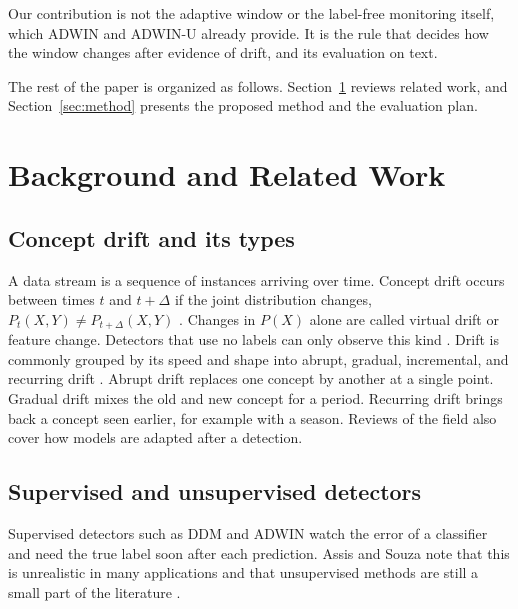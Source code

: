 \documentclass[conference]{IEEEtran}
\begin{document}
Our contribution is not the adaptive window or the label-free monitoring itself, which ADWIN and ADWIN-U already provide. It is the rule that decides how the window changes after evidence of drift, and its evaluation on text.

The rest of the paper is organized as follows. Section~\ref{sec:related} reviews related work, and Section~\ref{sec:method} presents the proposed method and the evaluation plan.

\section{Background and Related Work}
\label{sec:related}

\subsection{Concept drift and its types}

A data stream is a sequence of instances arriving over time. Concept drift occurs between times $t$ and $t+\Delta$ if the joint distribution changes, $P_t(X,Y)\neq P_{t+\Delta}(X,Y)$ \cite{gama2014}. Changes in $P(X)$ alone are called virtual drift or feature change. Detectors that use no labels can only observe this kind \cite{assis2025}. Drift is commonly grouped by its speed and shape into abrupt, gradual, incremental, and recurring drift \cite{webb2016,suarez2023}. Abrupt drift replaces one concept by another at a single point. Gradual drift mixes the old and new concept for a period. Recurring drift brings back a concept seen earlier, for example with a season. Reviews of the field \cite{gama2014,lu2019} also cover how models are adapted after a detection.

\subsection{Supervised and unsupervised detectors}

Supervised detectors such as DDM \cite{gama2004} and ADWIN \cite{bifet2007} watch the error of a classifier and need the true label soon after each prediction. Assis and Souza note that this is unrealistic in many applications and that unsupervised methods are still a small part of the literature \cite{assis2025}.
\end{document}
